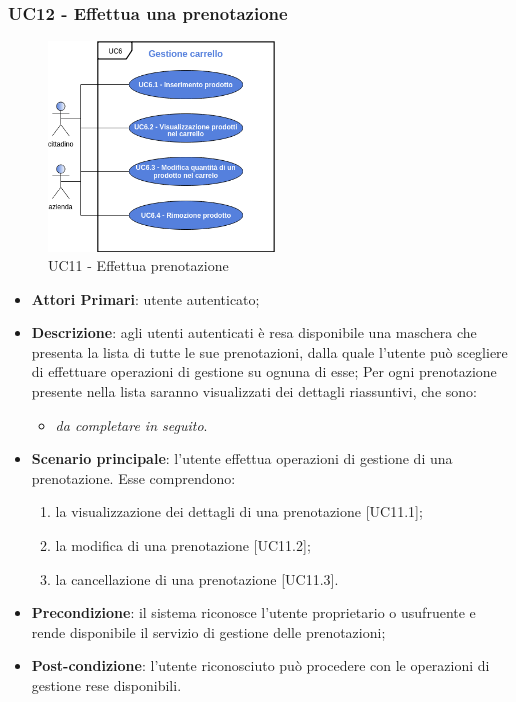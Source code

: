 \subsubsection{UC12 - Effettua una prenotazione}
 \begin{figure}[h]
	\includegraphics[width=6cm]{res/images/UC6GestioneCarrello.png}
	\centering
	\caption{UC11 - Effettua prenotazione}
\end{figure}
\begin{itemize}
	\item \textbf{Attori Primari}: utente autenticato;
	\item \textbf{Descrizione}: agli utenti autenticati è resa disponibile una maschera che presenta la lista di tutte le sue prenotazioni, dalla quale l'utente può scegliere di effettuare operazioni di gestione su ognuna di esse;
	Per ogni prenotazione presente nella lista saranno visualizzati dei dettagli riassuntivi, che sono:
	\begin{itemize}
		\item \textit{da completare in seguito}.
	\end{itemize}
	\item \textbf{Scenario principale}: l'utente effettua operazioni di gestione di una prenotazione. Esse comprendono:
	\begin{enumerate}[label=\alph*.]
		\item la visualizzazione dei dettagli di una prenotazione [UC11.1];
		\item la modifica di una prenotazione [UC11.2];
		\item la cancellazione di una prenotazione [UC11.3].
	\end{enumerate}
	\item \textbf{Precondizione}: il sistema riconosce l'utente proprietario o usufruente e rende disponibile il servizio di gestione delle prenotazioni;
	\item \textbf{Post-condizione}: l'utente riconosciuto può procedere con le operazioni di gestione rese disponibili.
\end{itemize} 
